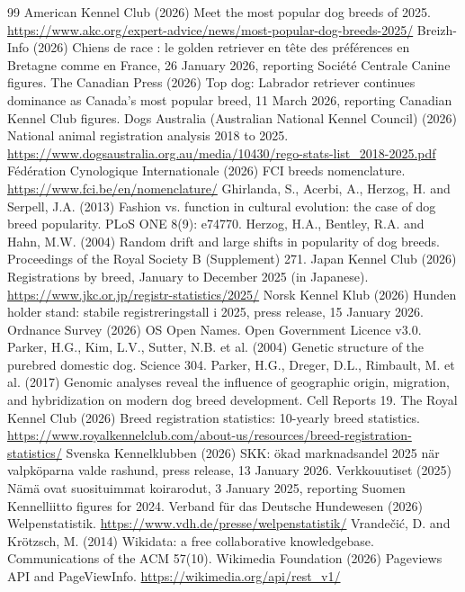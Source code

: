 \documentclass[11pt,a4paper]{article}
\begin{document}
\begin{thebibliography}{99}\small
{} American Kennel Club (2026) Meet the most popular dog breeds of 2025. \url{https://www.akc.org/expert-advice/news/most-popular-dog-breeds-2025/}
 Breizh-Info (2026) Chiens de race : le golden retriever en tête des préférences en Bretagne comme en France, 26 January 2026, reporting Société Centrale Canine figures.
 The Canadian Press (2026) Top dog: Labrador retriever continues dominance as Canada's most popular breed, 11 March 2026, reporting Canadian Kennel Club figures.
 Dogs Australia (Australian National Kennel Council) (2026) National animal registration analysis 2018 to 2025. \url{https://www.dogsaustralia.org.au/media/10430/rego-stats-list_2018-2025.pdf}
 Fédération Cynologique Internationale (2026) FCI breeds nomenclature. \url{https://www.fci.be/en/nomenclature/}
 Ghirlanda, S., Acerbi, A., Herzog, H. and Serpell, J.A. (2013) Fashion vs. function in cultural evolution: the case of dog breed popularity. PLoS ONE 8(9): e74770.
 Herzog, H.A., Bentley, R.A. and Hahn, M.W. (2004) Random drift and large shifts in popularity of dog breeds. Proceedings of the Royal Society B (Supplement) 271.
 Japan Kennel Club (2026) Registrations by breed, January to December 2025 (in Japanese). \url{https://www.jkc.or.jp/registr-statistics/2025/}
 Norsk Kennel Klub (2026) Hunden holder stand: stabile registreringstall i 2025, press release, 15 January 2026.
 Ordnance Survey (2026) OS Open Names. Open Government Licence v3.0.
 Parker, H.G., Kim, L.V., Sutter, N.B. et al. (2004) Genetic structure of the purebred domestic dog. Science 304.
 Parker, H.G., Dreger, D.L., Rimbault, M. et al. (2017) Genomic analyses reveal the influence of geographic origin, migration, and hybridization on modern dog breed development. Cell Reports 19.
 The Royal Kennel Club (2026) Breed registration statistics: 10-yearly breed statistics. \url{https://www.royalkennelclub.com/about-us/resources/breed-registration-statistics/}
 Svenska Kennelklubben (2026) SKK: ökad marknadsandel 2025 när valpköparna valde rashund, press release, 13 January 2026.
 Verkkouutiset (2025) Nämä ovat suosituimmat koirarodut, 3 January 2025, reporting Suomen Kennelliitto figures for 2024.
 Verband für das Deutsche Hundewesen (2026) Welpenstatistik. \url{https://www.vdh.de/presse/welpenstatistik/}
 Vrandečić, D. and Krötzsch, M. (2014) Wikidata: a free collaborative knowledgebase. Communications of the ACM 57(10).
 Wikimedia Foundation (2026) Pageviews API and PageViewInfo. \url{https://wikimedia.org/api/rest_v1/}
\end{thebibliography}
\end{document}
